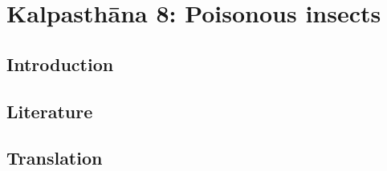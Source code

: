 \chapter{Kalpasthāna 8: Poisonous insects}

\section{Introduction} 


    
    

\section{Literature} 

\section{Translation}

